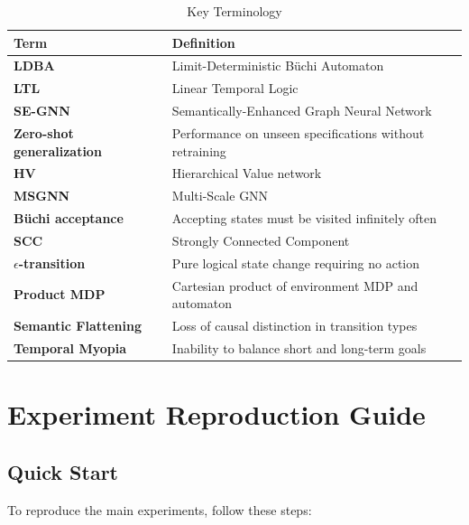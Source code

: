 \documentclass[conference]{IEEEtran}
\begin{document}
\begin{table}[h]
\centering
\caption{Key Terminology}
\begin{tabular}{@{}p{3cm}p{5cm}@{}}
\toprule
\textbf{Term} & \textbf{Definition} \\ \midrule
\textbf{LDBA} & Limit-Deterministic Büchi Automaton \\
\textbf{LTL} & Linear Temporal Logic \\
\textbf{SE-GNN} & Semantically-Enhanced Graph Neural Network \\
\textbf{Zero-shot generalization} & Performance on unseen specifications without retraining \\
\textbf{HV} & Hierarchical Value network \\
\textbf{MSGNN} & Multi-Scale GNN \\
\textbf{Büchi acceptance} & Accepting states must be visited infinitely often \\
\textbf{SCC} & Strongly Connected Component \\
\textbf{$\epsilon$-transition} & Pure logical state change requiring no action \\
\textbf{Product MDP} & Cartesian product of environment MDP and automaton \\
\textbf{Semantic Flattening} & Loss of causal distinction in transition types \\
\textbf{Temporal Myopia} & Inability to balance short and long-term goals \\
\bottomrule
\end{tabular}
\end{table}

\section{Experiment Reproduction Guide}
\label{sec:appendix_c}

\subsection{Quick Start}

To reproduce the main experiments, follow these steps:
\end{document}
